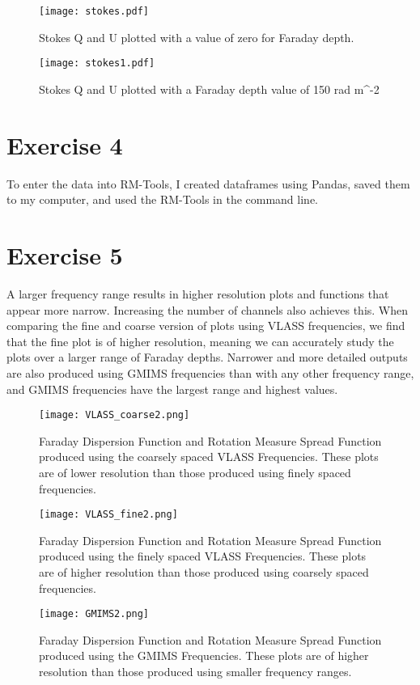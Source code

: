 \documentclass{article}
\begin{document}
\begin{figure}[hbt!]
\centering
\texttt{[image: stokes.pdf]}
\label{fig:rel_err}
\caption{Stokes Q and U plotted with a value of zero for Faraday depth.}
\end{figure}

\begin{figure}[hbt!]
\centering
\texttt{[image: stokes1.pdf]}
\label{fig:rel_err}
\caption{Stokes Q and U plotted with a Faraday depth value of 150 rad m^-2}
\end{figure}

\section*{Exercise 4}
To enter the data into RM-Tools, I created dataframes using Pandas, saved them to my computer, and used the RM-Tools in the command line.
\section*{Exercise 5}
A larger frequency range results in higher resolution plots and functions that appear more narrow. Increasing the number of channels also achieves this. When comparing the fine and coarse version of plots using VLASS frequencies, we find that the fine plot is of higher resolution, meaning we can accurately study the plots over a larger range of Faraday depths. Narrower and more detailed outputs are also produced using GMIMS frequencies than with any other frequency range, and GMIMS frequencies have the largest range and highest values.
\begin{figure}[hbt!]
\centering
\texttt{[image: VLASS\_coarse2.png]}
\label{fig:rel_err}
\caption{Faraday Dispersion Function and Rotation Measure Spread Function produced using the coarsely spaced VLASS Frequencies. These plots are of lower resolution than those produced using finely spaced frequencies.}
\end{figure}

\begin{figure}[hbt!]
\centering
\texttt{[image: VLASS\_fine2.png]}
\label{fig:rel_err}
\caption{Faraday Dispersion Function and Rotation Measure Spread Function produced using the finely spaced VLASS Frequencies. These plots are of higher resolution than those produced using coarsely spaced frequencies.}
\end{figure}

\begin{figure}[hbt!]
\centering
\texttt{[image: GMIMS2.png]}
\label{fig:rel_err}
\caption{Faraday Dispersion Function and Rotation Measure Spread Function produced using the GMIMS Frequencies. These plots are of higher resolution than those produced using smaller frequency ranges.}
\end{figure}
\end{document}
